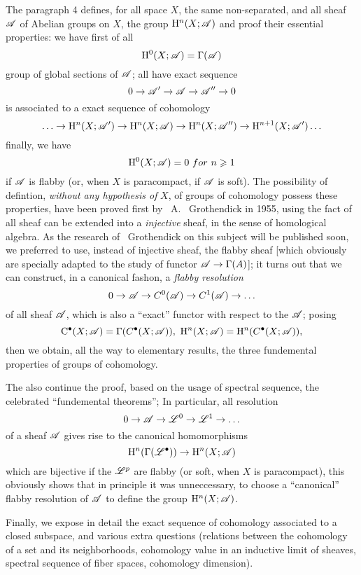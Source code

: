 \oldpage[III]
The paragraph 4 defines, for all space $X$, the same non-separated, and all sheaf $\mathscr{A}$ of Abelian groups on $X$, the group $\mathrm{H}^n(X;\mathscr{A})$ and 
proof their essential properties: we have first of all
\[
    \mathrm{H}^0(X;\mathscr{A}) = \Gamma({\mathscr{A}})
\]
group of global sections of $\mathscr{A}$; all have exact sequence
\[
    0\rightarrow \mathscr{A'} \rightarrow \mathscr{A} \rightarrow \mathscr{A''} \rightarrow 0
\]
is associated to a exact sequence of cohomology
\[
    \ldots\rightarrow \mathrm{H}^n(X;\mathscr{A'}) \rightarrow \mathrm{H}^n(X;\mathscr{A}) \rightarrow \mathrm{H}^n(X;\mathscr{A''}) \rightarrow \mathrm{H}^{n+1}(X;\mathscr{A'}) \ldots
\]
finally, we have
\[
    \mathrm{H}^0(X;\mathscr{A}) = 0\ for\ n\geqslant 1
\]
if $\mathscr{A}$ is flabby (or, when $X$ is paracompact, if $\mathscr{A}$ is soft). 
The possibility of defintion, \emph{without any hypothesis of} $X$, of groups of cohomology possess these properties, 
have been proved first by ~A. ~Grothendick in 1955, using the fact of all sheaf can be extended into a \emph{injective} sheaf, in the sense of homological algebra. 
As the research of ~Grothendick on this subject will be published soon, we preferred to use, instead of injective sheaf, 
the flabby sheaf [which obviously are specially adapted to the study of functor $\mathscr{A}\rightarrow \Gamma({A})$]; 
it turns out that we can construct, in a canonical fashon, a \emph{flabby resolution}
\[
    0\rightarrow \mathscr{A} \rightarrow C^0(\mathscr{A}) \rightarrow C^1(\mathscr{A}) \rightarrow \ldots
\]
of all sheaf $\mathscr{A}$, which is also a ``exact'' functor with respect to the $\mathscr{A}$; posing
\[
    \cx{\CC}(X;\sh{A}) = \Gamma(\cx{C}(X;\sh{A})),\ 
    \HH^n(X;\sh{A}) = \HH^n(\cx{C}(X;\sh{A})),
\]
then we obtain, all the way to elementary results, the three fundemental properties of groups of cohomology.

The  also continue the proof, based on the usage of spectral sequence, the celebrated ``fundemental theorems''; 
In particular, all resolution
\[
    0\rightarrow \mathscr{A} \rightarrow \mathscr{L}^0 \rightarrow \mathscr{L}^1 \rightarrow \ldots
\]
of a sheaf $\mathscr{A}$ gives rise to the canonical homomorphisms
\[
    \mathrm{H}^n(\Gamma({\mathscr{L}}^{\bullet})) \rightarrow \mathrm{H}^n(X;\mathscr{A})
\]
which are bijective if the $\mathscr{L}^p$ are flabby (or soft, when $X$ is paracompact), 
this obviously shows that in principle it was unneccessary, to choose a ``canonical'' flabby resolution of $\mathscr{A}$ to define the group $\mathrm{H}^n(X;\mathscr{A})$.

\oldpage[IV]
Finally, we expose in detail the exact sequence of cohomology associated to a closed subspace, and 
various extra questions 
(relations between the cohomology of a set and its neighborhoods, cohomology value in an inductive limit of sheaves, spectral sequence of fiber spaces, cohomology dimension).

